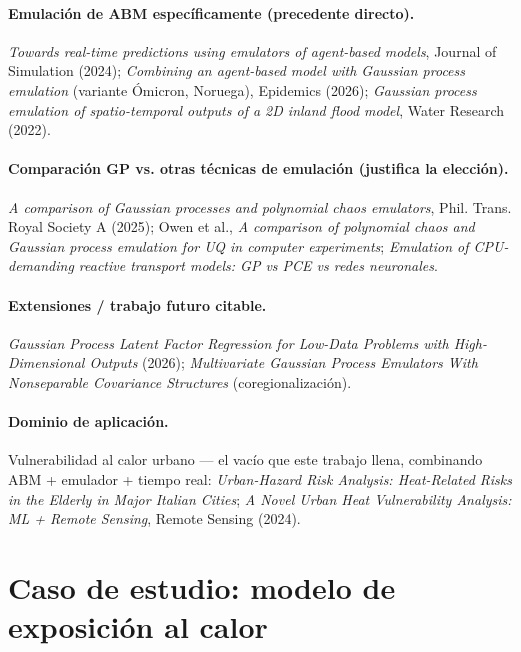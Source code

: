 \documentclass[11pt,a4paper]{article}
\begin{document}
\paragraph{Emulación de ABM específicamente (precedente directo).}
\emph{Towards real-time predictions using emulators of agent-based models},
Journal of Simulation (2024); \emph{Combining an agent-based model with
Gaussian process emulation} (variante Ómicron, Noruega), Epidemics (2026);
\emph{Gaussian process emulation of spatio-temporal outputs of a 2D inland
flood model}, Water Research (2022).

\paragraph{Comparación GP vs. otras técnicas de emulación (justifica la elección).}
\emph{A comparison of Gaussian processes and polynomial chaos emulators},
Phil. Trans. Royal Society A (2025); Owen et al., \emph{A comparison of
polynomial chaos and Gaussian process emulation for UQ in computer
experiments}; \emph{Emulation of CPU-demanding reactive transport models: GP
vs PCE vs redes neuronales}.

\paragraph{Extensiones / trabajo futuro citable.}
\emph{Gaussian Process Latent Factor Regression for Low-Data Problems with
High-Dimensional Outputs} (2026); \emph{Multivariate Gaussian Process
Emulators With Nonseparable Covariance Structures} (coregionalización).

\paragraph{Dominio de aplicación.}
Vulnerabilidad al calor urbano --- el vacío que este trabajo llena,
combinando ABM + emulador + tiempo real: \emph{Urban-Hazard Risk Analysis:
Heat-Related Risks in the Elderly in Major Italian Cities}; \emph{A Novel
Urban Heat Vulnerability Analysis: ML + Remote Sensing}, Remote Sensing
(2024).

\section{Caso de estudio: modelo de exposición al calor}
\end{document}
